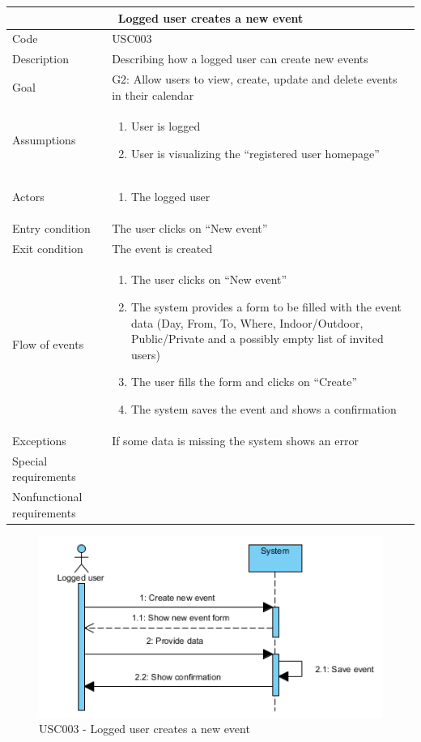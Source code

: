 \documentclass[10pt,a4paper,titlepage]{article}
\begin{document}
\begin{tabular}[h]{| p{3cm} | p{10cm} |}
\hline \multicolumn{2}{|c|}{\textbf{Logged user creates a new event}} \\ 
\hline Code & USC003 \\ 
\hline Description & Describing how a logged user can create new events \\
\hline Goal & G2: Allow users to view, create, update and delete events in their calendar\\
\hline Assumptions  & \begin{enumerate}
\item User is logged
\item User is visualizing the “registered user homepage”
\end{enumerate} \\
\hline Actors &  \begin{enumerate}
\item The logged user
\end{enumerate} \\
\hline Entry condition & The user clicks on “New event” \\
\hline Exit condition & The event is created \\
\hline Flow of events & \begin{enumerate}
\item The user clicks on “New event”
\item The system provides a form to be filled with the event data (Day, From, To, Where, Indoor/Outdoor, Public/Private and a possibly empty list of invited users)
\item The user fills the form and clicks on “Create”
\item The system saves the event and shows a confirmation
\end{enumerate}\\
\hline Exceptions & If some data is missing the system shows an error \\
\hline Special requirements &  \\
\hline Nonfunctional requirements &  \\
\hline
\end{tabular}
\begin{figure}[h]
\centering
\includegraphics[width=\linewidth]{./Sequence_diag/USC003.png}
\caption[USC003]{USC003 - Logged user creates a new event}
\label{fig:USC003}
\end{figure}
\end{document}
